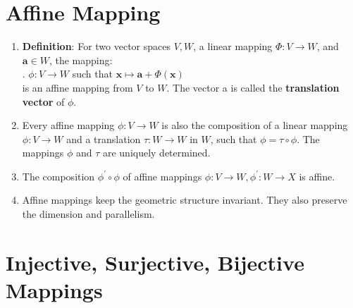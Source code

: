 \section{Affine Mapping}

\begin{enumerate}
    \item \textbf{Definition}: For two vector spaces $V, W$, a linear mapping $\Phi : V \to W$, and $\bm{a} \in W$, the mapping:
    \hfill \cite{mfml/book/mml/Deisenroth-Faisal-Ong}
    \\
    .\hfill
    $ \phi : V \to W $ such that $ \bm{x} \mapsto \bm{a} + \Phi(\bm{x}) $
    \hfill \cite{mfml/book/mml/Deisenroth-Faisal-Ong}
    \\
    is an affine mapping from $V$ to $W$. 
    The vector a is called the \textbf{translation vector} of $\phi$.
    \hfill \cite{mfml/book/mml/Deisenroth-Faisal-Ong}

    \item Every affine mapping $\phi  : V \to W$ is also the composition of a linear mapping $\phi  : V \to W$ and a translation $\tau : W \to W$ in $W$, such that $\phi  = \tau \circ \phi $. 
    The mappings $\phi $ and $\tau$ are uniquely determined.
    \hfill \cite{mfml/book/mml/Deisenroth-Faisal-Ong}

    \item The composition $\phi ^\prime \circ \phi $ of affine mappings $\phi  : V \to W, \phi ^\prime: W \to X$ is affine.
    \hfill \cite{mfml/book/mml/Deisenroth-Faisal-Ong}

    \item Affine mappings keep the geometric structure invariant. 
    They also preserve the dimension and parallelism.
    \hfill \cite{mfml/book/mml/Deisenroth-Faisal-Ong}
\end{enumerate}



























\section{Injective, Surjective, Bijective Mappings}

